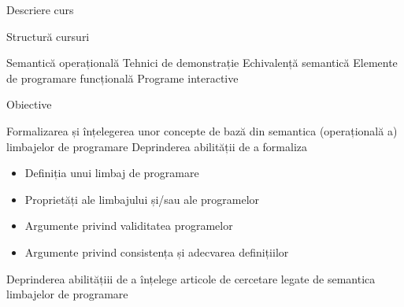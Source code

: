 \documentclass[xcolor=pdftex,romanian,colorlinks]{beamer}
\begin{document}
\begin{section}{Descriere curs}
\begin{frame}{Structură cursuri}{}
\begin{itemize}
 Semantică operațională 
 Tehnici de demonstrație
 Echivalență semantică
 Elemente de programare funcțională 
 Programe interactive
\end{itemize}
\end{frame}

\begin{frame}{Obiective}
\begin{itemize}
\vitem Formalizarea și înțelegerea unor concepte de bază din semantica (operațională a) limbajelor de programare
\vitem Deprinderea abilității de a formaliza
\begin{itemize}
\item Definiția unui limbaj de programare
\item Proprietăți ale limbajului și/sau ale programelor
\item Argumente privind validitatea programelor 
\item Argumente privind consistența și adecvarea definițiilor
\end{itemize}
\vitem Deprinderea abilitățiii de a înțelege articole de cercetare legate de semantica limbajelor de programare
\end{itemize}
\end{frame}


\end{section}
\end{document}
